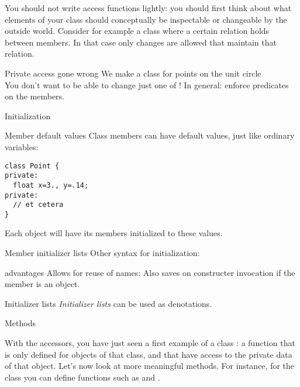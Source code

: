 You should not write access functions lightly: you should first think
about what elements of your class should conceptually be inspectable
or changeable by the outside world.  Consider for example a class
where a certain relation holds between members. In that case only
changes are allowed that maintain that relation.

\begin{block}{Private access gone wrong}
  \label{sl:privatenogood}
  We make a class for points on the unit circle\\
  You don't want to be able to change just one of !
  In general: enforce predicates on the members.
\end{block}

 {Initialization}

\begin{block}{Member default values}
  \label{sl:class-defval}
  Class members can have default values, just like ordinary variables:
\begin{lstlisting}
class Point {
private:
  float x=3., y=.14;
private:
  // et cetera
}
\end{lstlisting}
  Each object will have its members initialized to these values.
\end{block}

\begin{block}{Member initializer lists}
  \label{sl:class-init}
  Other syntax for initialization:
\end{block}

\begin{block}{advantages}
  \label{sl:class-init-why}
  Allows for reuse of names:
  Also saves on constructer invocation if the member is an object.
\end{block}

\begin{block}{Initializer lists}
  \label{sl:class-inlist}
  \emph{Initializer lists} can be used as denotations.
\end{block}

 {Methods}

With the accessors, you have just seen a first example of a class
: a function that is only defined for objects of
that class, and that have access to the private data of that object.
Let's now look at more meaningful methods. For instance, for the
 class you can define functions such as  and
. 
%

